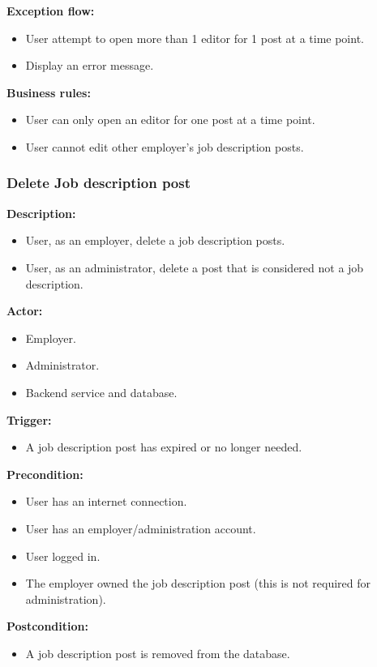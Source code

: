 \documentclass[a4paper]{article}
\begin{document}
\textbf{Exception flow:}
\begin{itemize}
  \item User attempt to open more than 1 editor for 1 post at a time point.
  \item Display an error message.
\end{itemize}

\textbf{Business rules:}
\begin{itemize}
  \item User can only open an editor for one post at a time point.
  \item User cannot edit other employer's job description posts.
\end{itemize}

\subsubsection{Delete Job description post}
\textbf{Description:}
\begin{itemize}
  \item User, as an employer, delete a job description posts.
  \item User, as an administrator, delete a post that is considered not a job description.
\end{itemize}

\textbf{Actor:}
\begin{itemize}
  \item Employer.
  \item Administrator.
  \item Backend service and database.
\end{itemize}

\textbf{Trigger:}
\begin{itemize}
  \item A job description post has expired or no longer needed.
\end{itemize}

\textbf{Precondition:}
\begin{itemize}
  \item User has an internet connection.
  \item User has an employer/administration account.
  \item User logged in.
  \item The employer owned the job description post (this is not required for administration).
\end{itemize}

\textbf{Postcondition:}
\begin{itemize}
  \item A job description post is removed from the database.
\end{itemize}
\end{document}
